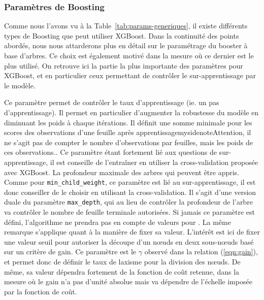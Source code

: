 \subsubsection{Paramètres de Boosting}
Comme nous l'avons vu à la Table~\ref{tab:params-generiques}, il existe différents types de Boosting que peut utiliser XGBoost. Dans la continuité des points abordés, nous nous attarderons plus en détail sur le paramétrage du booster à base d'arbres. Ce choix est également motivé dans la mesure où ce dernier est le plus utilisé. On retrouve ici la partie la plus importante des paramètres pour XGBoost, et en particulier ceux permettant de contrôler le sur-apprentissage par le modèle.

Ce paramètre permet de contrôler le taux d'apprentissage (ie. un \og pas d'apprentissage\fg). Il permet en particulier d'augmenter la robustesse du modèle en diminuant les poids à chaque itérations.
Il définit une somme minimale pour les scores des observations d'une feuille après apprentissagemysidenote{Attention, il ne s'agit pas de compter le nombre d'observations par feuilles, mais les poids de ces observations.}. Ce paramètre étant fortement lié aux questions de sur-apprentissage, il est conseille de l'entraîner en utiliser la cross-validation proposée avec XGBoost.
La profondeur maximale des arbres qui peuvent être appris. Comme pour \texttt{min\_child\_weight}, ce paramètre est lié au sur-apprentissage, il est donc conseiller de le choisir en utilisant la cross-validation.
Il s'agit d'une version \og duale\fg{} du paramètre \texttt{max\_depth}, qui au lieu de contrôler la profondeur de l'arbre va contrôler le nombre de feuille terminale autorisées. Si jamais ce paramètre est défini, l'algorithme ne prendra pas en compte de valeurs pour . La même remarque s'applique quant à la manière de fixer sa valeur.
L'intérêt est ici de fixer une valeur seuil pour autoriser la découpe d'un n\oe uds en deux sous-n\oe uds basé sur un critère de gain. Ce paramètre est le $\gamma$ observé dans la relation (\ref{eqn:gain}), et permet donc de définir le taux de laxisme pour la division des n\oe uds. De même, sa valeur dépendra fortement de la fonction de coût retenue, dans la mesure où le gain n'a pas d'unité absolue mais va dépendre de l'échelle imposée par la fonction de coût.

